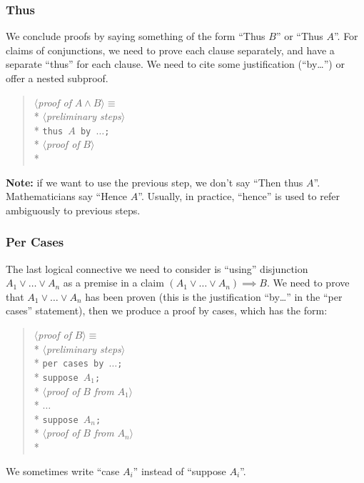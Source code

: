 \subsubsection{Thus}
We conclude proofs by saying something of the form ``Thus $B$'' or
``Thus $A$''. For claims of conjunctions, we need to prove each clause
separately, and have a separate ``thus'' for each clause. We need to
cite some justification (``by\dots'') or offer a nested subproof.
\begin{verse}
$\langle${\em proof of \/}$A\wedge B\rangle \equiv$\\*
\qquad $\langle${\em preliminary steps\/}$\rangle$\\*
\qquad \verb|thus |$A$\verb| by |$\ldots$\verb|;|\\*
\qquad $\langle${\em proof of \/}$B\rangle$\\*
\end{verse}
\textbf{Note:} if we want to use the previous step, we don't say ``Then
thus $A$''. Mathematicians say ``Hence $A$''. Usually, in practice, ``hence'' is
used to refer ambiguously to previous steps.

\subsubsection{Per Cases}
The last logical connective we need to consider is ``using'' disjunction
$A_{1}\lor\dots\lor A_{n}$ as a premise in a claim
$(A_{1}\lor\dots\lor A_{n})\implies B$. We need to prove that
$A_{1}\lor\dots\lor A_{n}$ has been proven (this is the justification
``by\dots'' in the ``per cases'' statement), then we produce a proof by
cases, which has the form:
\begin{verse}
$\langle${\em proof of \/}$B\rangle \equiv$\\*
\qquad $\langle${\em preliminary steps\/}$\rangle$\\*
\qquad \verb|per cases by |$\ldots$\verb|;|\\*
\qquad \verb|suppose |$A_1$\verb|;|\\*
\qquad\quad $\langle${\em proof of \/}$B$ {\em from \/}$A_1\rangle$\\*
\qquad $\ldots$\\*
\qquad \verb|suppose |$A_n$\verb|;|\\*
\qquad\quad $\langle${\em proof of \/}$B$ {\em from \/}$A_n\rangle$\\*
\end{verse}
We sometimes write ``case $A_{i}$'' instead of ``suppose $A_{i}$''.

